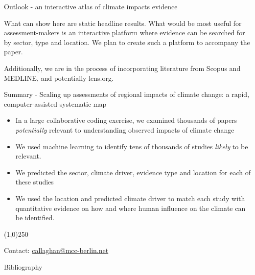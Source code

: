 \documentclass[9pt]{beamer}
\begin{document}
\begin{frame}{Outlook - an interactive atlas of climate impacts evidence}

What can show here are static headline results. What would be most useful for assessment-makers is an interactive platform where evidence can be searched for by sector, type and location. We plan to create such a platform to accompany the paper. 

\medskip

Additionally, we are in the process of incorporating literature from Scopus and MEDLINE, and potentially lens.org.
\end{frame}



\begin{frame}{Summary - Scaling up assessments of regional impacts of climate change: a rapid, computer-assisted systematic map}

\begin{itemize}
	\item In a large collaborative coding exercise, we examined thousands of papers \textit{potentially} relevant to understanding observed impacts of climate change
	\item We used machine learning to identify tens of thousands of studies \textit{likely} to be relevant.
	\item We predicted the sector, climate driver, evidence type and location for each of these studies
	\item We used the location and predicted climate driver to match each study with quantitative evidence on how and where human influence on the climate can be identified.
\end{itemize}

\begin{center}
	\line(1,0){250}
	
	\medskip
	
	Contact: \url{callaghan@mcc-berlin.net}

\end{center}



\end{frame}

\begin{frame}{Bibliography}

\end{frame}
\end{document}
